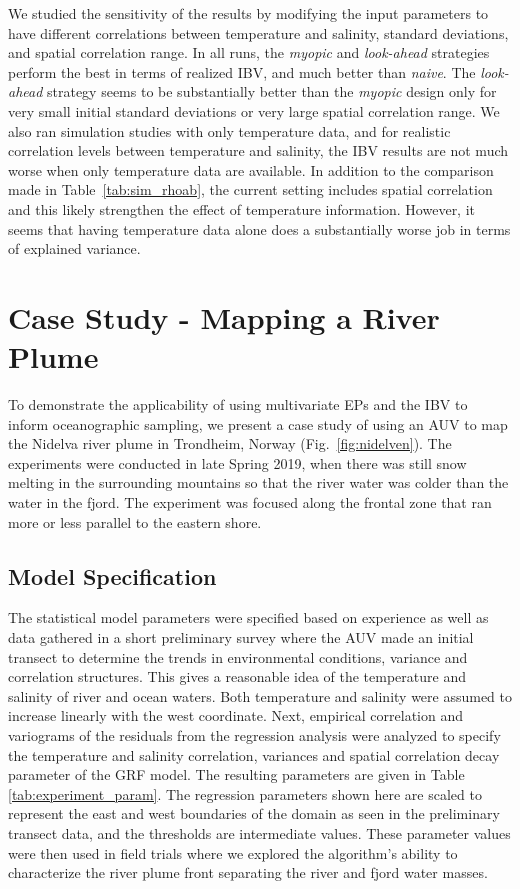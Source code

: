 \documentclass[aoas]{imsart}
\begin{document}
We studied the sensitivity of the results by modifying the input
parameters to have different correlations between temperature and
salinity, standard deviations, and spatial correlation range.  In all
runs, the \textit{myopic} and \textit{look-ahead} strategies perform
the best in terms of realized IBV, and much better than
\textit{naive}. The \textit{look-ahead} strategy seems to be
substantially better than the \textit{myopic} design only for very
small initial standard deviations or very large spatial correlation
range. 
We also ran simulation studies with only temperature data, and for
realistic correlation levels between temperature and salinity, the IBV
results are not much worse when only temperature data are
available. In addition to the comparison made in
Table~\ref{tab:sim_rhoab}, the current setting includes spatial
correlation and this likely strengthen the effect of temperature information. However, it seems that having temperature data alone
does a substantially worse job in terms of explained variance.

\section{Case Study - Mapping a River Plume}
\label{sec:case_study}

To demonstrate the applicability of using multivariate EPs and the IBV
to inform oceanographic sampling, we present a case study of using an AUV to map the Nidelva river plume in Trondheim, Norway (Fig.~\ref{fig:nidelven}). The
experiments were conducted in late Spring 2019, when there was still
snow melting in the surrounding mountains so that the river water was colder than the water in the fjord. The experiment was
focused along the frontal zone that ran more or less parallel to the
eastern shore.

\subsection{Model Specification}
\label{sec:exp_modeling}

The statistical model parameters were specified based on experience as well as data gathered in a short
preliminary survey where the AUV made an initial transect to determine
the trends in environmental conditions, variance and correlation
structures. This gives a reasonable idea of the temperature and salinity of river and ocean waters. Both temperature and salinity were assumed to increase linearly with the west coordinate. Next, empirical correlation and variograms of the residuals from the regression analysis were analyzed to specify the temperature and salinity correlation, variances and spatial correlation decay parameter of the GRF model.
The resulting
parameters are given in Table \ref{tab:experiment_param}. The
regression parameters shown here are scaled to represent the east and
west boundaries of the domain as seen in the preliminary transect
data, and the thresholds are intermediate values. These parameter
values were then used in field trials where we explored the
algorithm's ability to characterize the river plume front separating
the river and fjord water masses.
\end{document}
